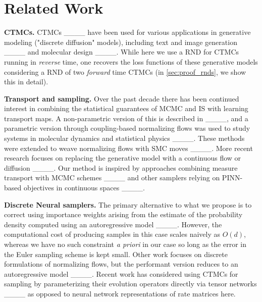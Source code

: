 \section{Related Work}
\label{sec:related_work}
\textbf{CTMCs.} CTMCs ____ have been used for various applications in generative modeling ("discrete diffusion" models), including text and image generation ____ and molecular design ____. While here we use a RND for CTMCs running in \emph{reverse} time, one recovers the loss functions of these generative models considering a RND of two \emph{forward} time CTMCs (in \cref{sec:proof_rnds}, we show this in detail).

\textbf{Transport and sampling.}
Over the past decade there has been continued interest in combining the statistical guarantees of MCMC and IS with learning transport maps. A non-parametric version of this is described in ____, and a parametric version through coupling-based normalizing flows was used to study systems in molecular dynamics and statistical physics ____. These methods were extended to weave normalizing flows with SMC moves ____. More recent research focuses on replacing the generative model with a continuous flow or diffusion ____. Our method is inspired by approaches combining measure transport with MCMC schemes ____ and other samplers relying on PINN-based objectives in continuous spaces ____.

\textbf{Discrete Neural samplers.} The primary alternative to what we propose is to correct using importance weights arising from the estimate of the probability density computed using an autoregressive model ____. However, the computational cost of producing samples in this case scales naively as $O(d)$, whereas we have no such constraint \textit{a priori} in our case so long as the error in the Euler sampling scheme is kept small. Other work focuses on discrete formulations of normalizing flows, but the performant version reduces to an autoregressive model ____. Recent work has considered using CTMCs for sampling by parameterizing their evolution operators directly via tensor networks ____ as opposed to neural network representations of rate matrices here. 


